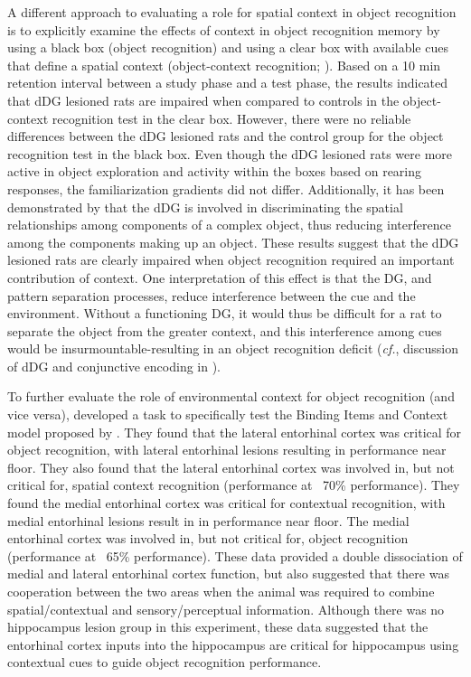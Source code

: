 \documentclass[doc, longtable]{apa6}
\begin{document}
A different approach to evaluating a role for spatial context in object recognition is to explicitly examine the effects of context in object recognition memory by using a black box (object recognition) and using a clear box with available cues that define a spatial context (object-context recognition; \cite{Dees2013}). Based on a 10 min retention interval between a study phase and a test phase, the results indicated that dDG lesioned rats are impaired when compared to controls in the object-context recognition test in the clear box. However, there were no reliable differences between the dDG lesioned rats and the control group for the object recognition test in the black box. Even though the dDG lesioned rats were more active in object exploration and activity within the boxes based on rearing responses, the familiarization gradients did not differ. 
Additionally, it has been demonstrated by \cite{kesner2015role} that the dDG is involved in discriminating the spatial relationships among components of a complex object, thus reducing interference among the components making up an object. These results suggest that the dDG lesioned rats are clearly impaired when object recognition required an important contribution of context. One interpretation of this effect is that the DG, and pattern separation processes, reduce interference between the cue and the environment. Without a functioning DG, it would thus be difficult for a rat to separate the object from the greater context, and this interference among cues would be insurmountable-resulting in an object recognition deficit (\textit{cf.}, discussion of dDG and conjunctive encoding in \cite{Hunsaker2007c}).

To further evaluate the role of environmental context for object recognition (and vice versa), \textcite{Hunsaker2013} developed a task to specifically test the Binding Items and Context model proposed by \textcite{Eichenbaum2007a}. They found that the lateral entorhinal cortex was critical for object recognition, with lateral entorhinal lesions resulting in performance near floor. They also found that the lateral entorhinal cortex was involved in, but not critical for, spatial context recognition (performance at ~70\% performance). They found the medial entorhinal cortex was critical for contextual recognition, with medial entorhinal lesions result in in performance near floor. The medial entorhinal cortex was involved in, but not critical for, object recognition (performance at ~65\% performance). These data provided a double dissociation of medial and lateral entorhinal cortex function, but also suggested that there was cooperation between the two areas when the animal was required to combine spatial/contextual and sensory/perceptual information. Although there was no hippocampus lesion group in this experiment, these data suggested that the entorhinal cortex inputs into the hippocampus are critical for hippocampus using contextual cues to guide object recognition performance. 
\end{document}
